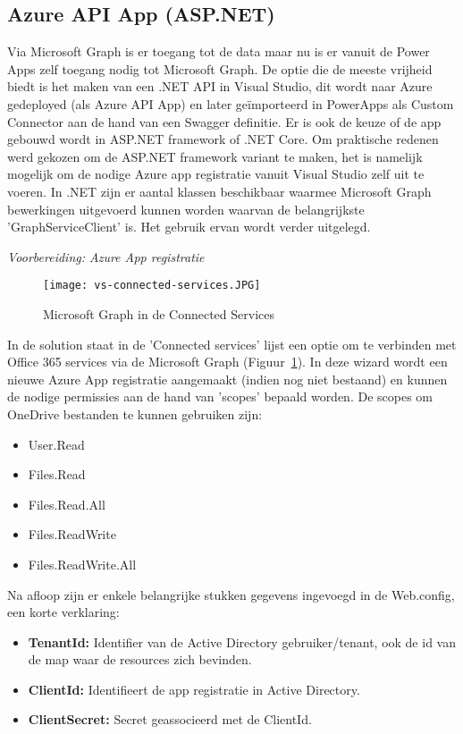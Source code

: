 \subsection{Azure API App (ASP.NET)}

Via Microsoft Graph is er toegang tot de data maar nu is er vanuit de Power Apps zelf toegang nodig tot Microsoft Graph. De optie die de meeste vrijheid biedt is het maken van een .NET API in Visual Studio, dit wordt naar Azure gedeployed (als Azure API App) en later geïmporteerd in PowerApps als Custom Connector aan de hand van een Swagger definitie. Er is ook de keuze of de app gebouwd wordt in ASP.NET framework of .NET Core. Om praktische redenen werd gekozen om de ASP.NET framework variant te maken, het is namelijk mogelijk om de nodige Azure app registratie vanuit Visual Studio zelf uit te voeren.
In .NET zijn er aantal klassen beschikbaar waarmee Microsoft Graph bewerkingen uitgevoerd kunnen worden waarvan de belangrijkste 'GraphServiceClient' is. Het gebruik ervan wordt verder uitgelegd.

\textit{Voorbereiding: Azure App registratie}

\begin{figure}[h!]
    \texttt{[image: vs-connected-services.JPG]}
    \caption{Microsoft Graph in de Connected Services}
    \label{fig:vs-connected-services}
\end{figure}

In de solution staat in de 'Connected services' lijst een optie om te verbinden met Office 365 services via de Microsoft Graph (Figuur~\ref{fig:vs-connected-services}). In deze wizard wordt een nieuwe Azure App registratie aangemaakt (indien nog niet bestaand) en kunnen de nodige permissies aan de hand van 'scopes' bepaald worden. De scopes om OneDrive bestanden te kunnen gebruiken zijn:
\begin{itemize}
    \item User.Read 
    \item Files.Read 
    \item Files.Read.All 
    \item Files.ReadWrite 
    \item Files.ReadWrite.All
\end{itemize}

Na afloop zijn er enkele belangrijke stukken gegevens ingevoegd in de Web.config, een korte verklaring:
\begin{itemize}
    \item \textbf{TenantId:} Identifier van de Active Directory gebruiker/tenant, ook de id van de map waar de resources zich bevinden.
    \item \textbf{ClientId:} Identifieert de app registratie in Active Directory.
    \item \textbf{ClientSecret:} Secret geassocieerd met de ClientId.
\end{itemize}

